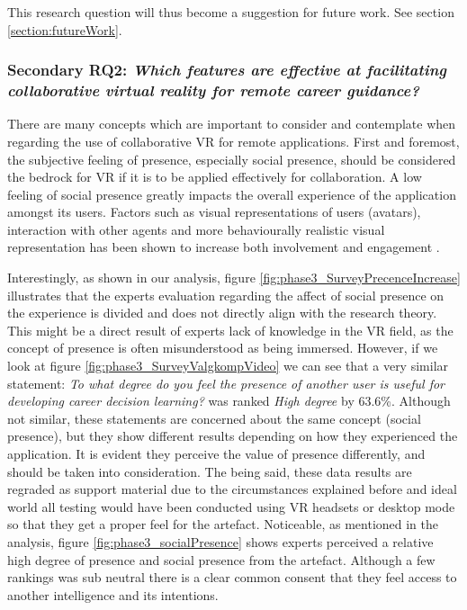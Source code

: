 This research question will thus become a suggestion for future work. See section \ref{section:futureWork}.  





\subsubsection{Secondary RQ2: \textit{Which features are effective at facilitating collaborative virtual reality for remote
career guidance?}} 
There are many concepts which are important to consider and contemplate when regarding the use of collaborative VR for remote applications. First and foremost, the subjective feeling of presence, especially social presence, should be considered the bedrock for VR if it is to be applied effectively for collaboration. A low feeling of social presence greatly impacts the overall experience of the application amongst its users. Factors such as visual representations of users (avatars), interaction with other agents and more behaviourally realistic visual representation has been shown to increase both involvement and engagement \cite{skalski2007role} \cite{oh2018systematic}. 

Interestingly, as shown in our analysis, figure \ref{fig:phase3_SurveyPrecenceIncrease} illustrates that the experts evaluation regarding the affect of social presence on the experience is divided and does not directly align with the research theory. This might be a direct result of experts lack of knowledge in the VR field, as the concept of presence is often misunderstood as being immersed. However, if we look at figure \ref{fig:phase3_SurveyValgkompVideo} we can see that a very similar statement: \textit{To what degree do you feel the presence of another user is useful for developing career decision learning?} was ranked \textit{High degree} by 63.6\%. Although not similar, these statements are concerned about the same concept (social presence), but they show different results depending on how they experienced the application. It is evident they perceive the value of presence differently, and should be taken into consideration. The being said, these data results are regraded as support material due to the circumstances explained before and ideal world all testing would have been conducted using VR headsets or desktop mode so that they get a proper feel for the artefact. 
Noticeable, as mentioned in the analysis, figure \ref{fig:phase3_socialPresence} shows experts perceived a relative high degree of presence and social presence from the artefact. Although a few rankings was sub neutral there is a clear common consent that they feel access to another intelligence and its intentions.

